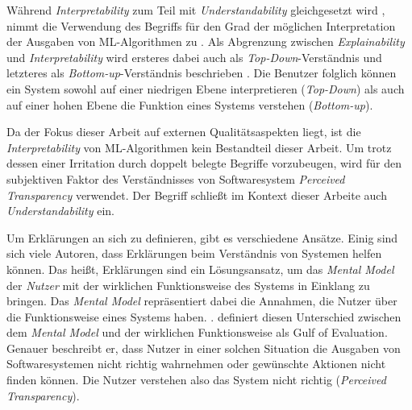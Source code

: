 Während \textit{Interpretability} zum Teil mit \textit{Understandability} gleichgesetzt wird \cite{chazette_end-users_nodate}, nimmt die Verwendung des Begriffs für den Grad der möglichen Interpretation der Ausgaben von ML-Algorithmen zu \cite{doshi2017towards}. Als Abgrenzung zwischen \textit{Explainability} und \textit{Interpretability} wird ersteres dabei auch als \textit{Top-Down}-Verständnis und letzteres als \textit{Bottom-up}-Verständnis beschrieben \cite{thomson_knowledge--information_2020}. Die Benutzer folglich können ein System sowohl auf einer niedrigen Ebene interpretieren (\textit{Top-Down}) als auch auf einer hohen Ebene die Funktion eines Systems verstehen (\textit{Bottom-up}).

Da der Fokus dieser Arbeit auf externen Qualitätsaspekten liegt, ist die \textit{Interpretability} von ML-Algorithmen kein Bestandteil dieser Arbeit. Um trotz dessen einer Irritation durch doppelt belegte Begriffe vorzubeugen, wird für den subjektiven Faktor des Verständnisses von Softwaresystem \textit{Perceived Transparency} verwendet. Der Begriff schließt im Kontext dieser Arbeite auch \textit{Understandability} ein.

\bigskip

Um Erklärungen an sich zu definieren, gibt es verschiedene Ansätze. Einig sind sich viele Autoren, dass Erklärungen beim Verständnis von Systemen helfen können. Das heißt, Erklärungen sind ein Lösungsansatz, um das \textit{Mental Model} der \textit{Nutzer} mit der wirklichen Funktionsweise des Systems in Einklang zu bringen. Das \textit{Mental Model} repräsentiert dabei die Annahmen, die Nutzer über die Funktionsweise eines Systems haben. \cite{chi_three_nodate}. \citeauthor{norman1988psychology} definiert diesen Unterschied zwischen dem \textit{Mental Model} und der wirklichen Funktionsweise als \glqq Gulf of Evaluation\grqq \cite{norman1988psychology}. Genauer beschreibt er, dass Nutzer in einer solchen Situation die Ausgaben von Softwaresystemen nicht richtig wahrnehmen oder gewünschte Aktionen nicht finden können. Die Nutzer verstehen also das System nicht richtig (\textit{Perceived Transparency}).

